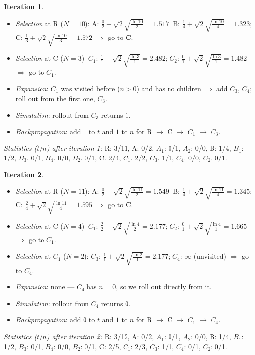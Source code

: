 \documentclass[11pt,a4paper]{article}
\begin{document}
\begin{solbox}
\textbf{Iteration 1.}
\begin{itemize}[leftmargin=1.5em,itemsep=1pt]
\item \emph{Selection} at R ($N=10$): A: $\frac{0}{2} + \sqrt2\sqrt{\frac{\ln 10}{2}} = 1.517$; B: $\frac{1}{4} + \sqrt2\sqrt{\frac{\ln 10}{4}} = 1.323$; C: $\frac{1}{3} + \sqrt2\sqrt{\frac{\ln 10}{3}} = 1.572$ $\Rightarrow$ go to \textbf{C}.
\item \emph{Selection} at C ($N=3$): $C_{1}$: $\frac{1}{1} + \sqrt2\sqrt{\frac{\ln 3}{1}} = 2.482$; $C_{2}$: $\frac{0}{1} + \sqrt2\sqrt{\frac{\ln 3}{1}} = 1.482$ $\Rightarrow$ go to \textbf{$C_{1}$}.
\item \emph{Expansion}: $C_{1}$ was visited before ($n>0$) and has no children $\Rightarrow$ add $C_{3}$, $C_{4}$; roll out from the first one, \textbf{$C_{3}$}.
\item \emph{Simulation}: rollout from $C_{3}$ returns $1$.
\item \emph{Backpropagation}: add $1$ to $t$ and $1$ to $n$ for R $\to$ C $\to$ $C_{1}$ $\to$ $C_{3}$.
\end{itemize}
\textit{Statistics ($t/n$) after iteration 1:} R: 3/11, A: 0/2, $A_{1}$: 0/1, $A_{2}$: 0/0, B: 1/4, $B_{1}$: 1/2, $B_{3}$: 0/1, $B_{4}$: 0/0, $B_{2}$: 0/1, C: 2/4, $C_{1}$: 2/2, $C_{3}$: 1/1, $C_{4}$: 0/0, $C_{2}$: 0/1.

\smallskip
\textbf{Iteration 2.}
\begin{itemize}[leftmargin=1.5em,itemsep=1pt]
\item \emph{Selection} at R ($N=11$): A: $\frac{0}{2} + \sqrt2\sqrt{\frac{\ln 11}{2}} = 1.549$; B: $\frac{1}{4} + \sqrt2\sqrt{\frac{\ln 11}{4}} = 1.345$; C: $\frac{2}{4} + \sqrt2\sqrt{\frac{\ln 11}{4}} = 1.595$ $\Rightarrow$ go to \textbf{C}.
\item \emph{Selection} at C ($N=4$): $C_{1}$: $\frac{2}{2} + \sqrt2\sqrt{\frac{\ln 4}{2}} = 2.177$; $C_{2}$: $\frac{0}{1} + \sqrt2\sqrt{\frac{\ln 4}{1}} = 1.665$ $\Rightarrow$ go to \textbf{$C_{1}$}.
\item \emph{Selection} at $C_{1}$ ($N=2$): $C_{3}$: $\frac{1}{1} + \sqrt2\sqrt{\frac{\ln 2}{1}} = 2.177$; $C_{4}$: $\infty$ (unvisited) $\Rightarrow$ go to \textbf{$C_{4}$}.
\item \emph{Expansion}: none --- \textbf{$C_{4}$} has $n=0$, so we roll out directly from it.
\item \emph{Simulation}: rollout from $C_{4}$ returns $0$.
\item \emph{Backpropagation}: add $0$ to $t$ and $1$ to $n$ for R $\to$ C $\to$ $C_{1}$ $\to$ $C_{4}$.
\end{itemize}
\textit{Statistics ($t/n$) after iteration 2:} R: 3/12, A: 0/2, $A_{1}$: 0/1, $A_{2}$: 0/0, B: 1/4, $B_{1}$: 1/2, $B_{3}$: 0/1, $B_{4}$: 0/0, $B_{2}$: 0/1, C: 2/5, $C_{1}$: 2/3, $C_{3}$: 1/1, $C_{4}$: 0/1, $C_{2}$: 0/1.


\end{solbox}
\end{document}
